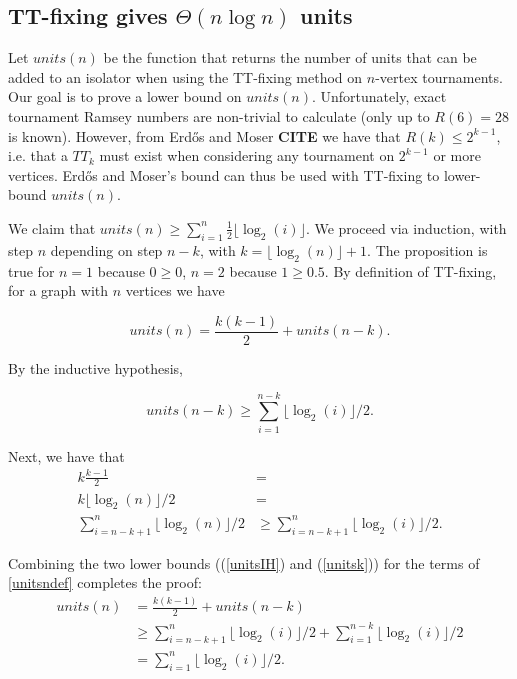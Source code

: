 \documentclass[conference]{IEEEtran}
\begin{document}
\subsection{TT-fixing gives $\Theta(n\log n)$ units}
Let $units(n)$ be the function that returns the number of units that can be added to an isolator when using the TT-fixing method on $n$-vertex tournaments. Our goal is to prove a lower bound on $units(n)$. Unfortunately, exact tournament Ramsey numbers are non-trivial to calculate (only up to $R(6) = 28$ is known). However, from Erd\H{o}s and Moser \textbf{CITE} we have that $R(k) \leq 2^{k-1}$, i.e. that a $TT_{k}$ must exist when considering any tournament on $2^{k-1}$ or more vertices. Erd\H{o}s and Moser's bound can thus be used with TT-fixing to lower-bound $units(n)$.

We claim that $units(n) \geq \sum\limits_{i=1}^n \frac{1}{2} \lfloor \log_2(i) \rfloor$. We proceed via induction, with step $n$ depending on step $n-k$, with $k=\lfloor \log_2(n)\rfloor + 1$. The proposition is true for $n=1$ because $0 \geq 0$, $n=2$ because $ 1 \geq 0.5$.  By definition of TT-fixing, for a graph with $n$ vertices we have 

\begin{equation}\label{unitsndef}
units(n) = \frac{k(k-1)}{2}  + units(n-k).
\end{equation} 

By the inductive hypothesis,

 \begin{equation}\label{unitsIH}
 units(n-k) \geq \sum\limits_{i=1}^{n-k} \lfloor \log_2(i)\rfloor/2.
 \end{equation}
 
 Next, we have that 
 \begin{align}
  k\frac{k-1}{2} &= \nonumber \\
  k \lfloor \log_2(n)\rfloor/2 &= \nonumber \\
 \sum\limits_{i=n-k+1}^{n} \lfloor \log_2(n)\rfloor/2 &\geq \sum\limits_{i=n-k+1}^{n} \lfloor \log_2(i)\rfloor/2  \label{unitsk}.
 \end{align}
 
 Combining the two lower bounds ((\ref{unitsIH}) and (\ref{unitsk})) for the terms of \cref{unitsndef} completes the proof: 
 \begin{align}
 units(n) &= \frac{k(k-1)}{2} + units(n-k) \nonumber \\
 &\geq \sum\limits_{i=n-k+1}^{n} \lfloor \log_2(i)\rfloor/2 + \sum\limits_{i=1}^{n-k} \lfloor \log_2(i)\rfloor/2 \\
 &= \sum\limits_{i=1}^{n} \lfloor \log_2(i)\rfloor/2.
 \end{align}
 
\end{document}

